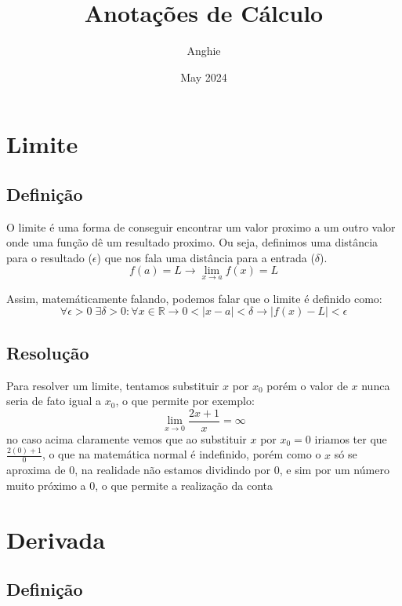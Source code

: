 \documentclass{article}
\title{Anotações de Cálculo}
\author{Anghie}
\date{May 2024}
\begin{document}
    \maketitle

    \tableofcontents
    \newpage

    \section{Limite}
    \subsection{Definição}
    O limite é uma forma de conseguir encontrar um valor
    proximo a um outro valor onde uma função dê um resultado
    proximo. Ou seja, definimos uma distância para o resultado
    ($\epsilon$) que nos fala uma distância para a entrada
    ($\delta$).
    \begin{equation*}
        f(a) = L \rightarrow \lim_{x\to a} f(x) = L
    \end{equation*}

    Assim, matemáticamente falando, podemos falar que o limite é
    definido como:
    \begin{equation*}
        \forall \epsilon > 0 \; \exists \delta > 0 : \forall x
        \in \mathbb{R} \rightarrow 0 < |x - a| < \delta \rightarrow
        |f(x) - L| < \epsilon
    \end{equation*}
    \subsection{Resolução}
    Para resolver um limite, tentamos substituir $x$ por $x_0$
    porém o valor de $x$ nunca seria de fato igual a $x_0$, o que
    permite por exemplo:
    \begin{equation*}
        \lim_{x\to 0} \frac{2x + 1}{x} = \infty
    \end{equation*}
    no caso acima claramente vemos que ao substituir $x$ por
    $x_0 = 0$ iriamos ter que $\frac{2(0) + 1}{0}$, o que na
    matemática normal é indefinido, porém como o $x$ só se aproxima
    de $0$, na realidade não estamos dividindo por $0$, e sim por um
    número muito próximo a $0$, o que permite a realização da conta

    \newpage
    \section{Derivada}
    \subsection{Definição}
\end{document}
